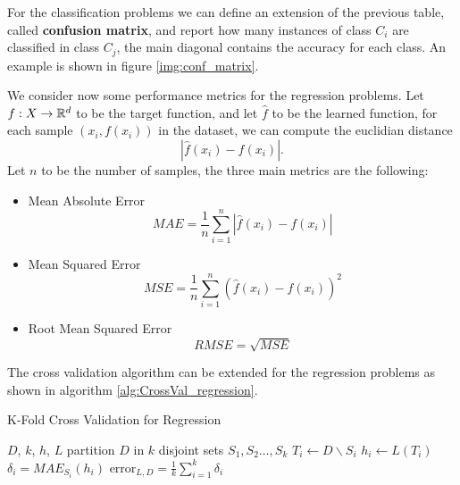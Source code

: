 \documentclass[10pt, letterpaper]{report}
\begin{document}
For the classification problems we can define an extension of the previous table, called \textbf{confusion matrix}, and report how many instances of class $C_i$ are classified in class $C_j$, the main diagonal contains the accuracy for each class. An example is shown in figure \ref{img:conf_matrix}.\bigskip

We consider now some performance metrics for the regression problems. Let $f:X\rightarrow{\mathbb R}^d$ to be the target function, and let $\hat f$ to be the learned function, for each sample $(x_i,f(x_i))$ in the dataset, we can compute the euclidian distance\begin{equation}
    |\hat f(x_i)-f(x_i)|.
\end{equation}
Let $n$ to be the number of samples, the three main metrics are the following:\begin{itemize}
    \item Mean Absolute Error\begin{equation}
        MAE=\frac{1}{n}\sum_{i=1}^n|\hat f(x_i)-f(x_i)|
    \end{equation}
    \item Mean Squared Error\begin{equation}
        MSE=\frac{1}{n}\sum_{i=1}^n(\hat f(x_i)-f(x_i))^2
    \end{equation}
    \item Root Mean Squared Error\begin{equation}
        RMSE=\sqrt{MSE}
    \end{equation}
\end{itemize}

The cross validation algorithm can be extended for the regression problems as shown in algorithm \ref{alg:CrossVal_regression}.

\begin{algorithm}
    \caption{K-Fold Cross Validation for Regression}\label{alg:CrossVal_regression}
    \begin{algorithmic}
    \Require $D$, $k$, $h$, $L$
    \State partition $D$ in $k$ disjoint sets $S_1,S_2\dots, S_k$
    \State $T_i\leftarrow  D\backslash S_i$
    \State $h_i\leftarrow L(T_i) $
    \State $\delta_i = MAE_{S_i}(h_i)$
    \EndFor
    \State\Return $\text{error}_{L,D}=\displaystyle\frac{1}{k}\sum_{i=1}^k\delta_i$
    \end{algorithmic}
\end{algorithm}
\end{document}
